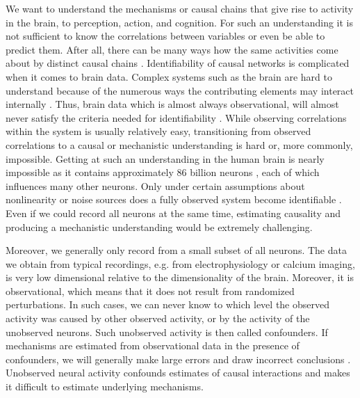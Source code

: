 \documentclass[11pt]{article}
\begin{document}
We want to understand the mechanisms or causal chains that give rise to activity in the brain, to perception, action, and cognition. For such an understanding it is not sufficient to know the correlations between variables or even be able to predict them. After all, there can be many ways how the same activities come about by distinct causal chains \citep{drton2011global, peters2017elements}. Identifiability of causal networks is complicated when it comes to brain data. Complex systems such as the brain are hard to understand because of the numerous ways the contributing elements may interact internally \citep{Jonas2017}. Thus, brain data which is almost always observational, will almost never satisfy the criteria needed for identifiability \citep{pearl2009causality}. While observing correlations within the system is usually relatively easy, transitioning from observed correlations to a causal or mechanistic understanding is hard or, more commonly, impossible.  Getting at such an understanding in the human brain is nearly impossible as it contains approximately 86 billion neurons \citep{azevedo2009equal}, each of which influences many other neurons. Only under certain assumptions about nonlinearity or noise sources does a fully observed system become identifiable \citep{daniusis2012inferring,shimizu2006linear}. Even if we could record all neurons at the same time, estimating causality and producing a mechanistic understanding would be extremely challenging.

Moreover, we generally only record from a small subset of all neurons. The data we obtain from typical recordings, e.g. from electrophysiology  or calcium imaging, is very low dimensional relative to the dimensionality of the brain. Moreover, it is observational, which means that it does not result from randomized perturbations. In such cases, we can never know to which level the observed activity was caused by other observed activity, or by the activity of the unobserved neurons. Such unobserved activity is then called confounders. If mechanisms are estimated from observational data in the presence of confounders, we will generally make large errors and draw incorrect conclusions \citep{angrist2008mostly}. Unobserved neural activity confounds estimates of causal interactions and makes it difficult to estimate underlying mechanisms.
\end{document}
